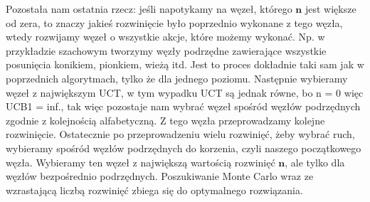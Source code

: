 Pozostała nam ostatnia rzecz: jeśli napotykamy na węzeł, którego $\boldsymbol{n}$ jest większe od zera, to znaczy jakieś rozwinięcie było poprzednio wykonane z tego węzła, wtedy rozwijamy węzeł o wszystkie akcje, które możemy wykonać. Np. w przykładzie szachowym tworzymy węzły podrzędne zawierające wszystkie posunięcia konikiem, pionkiem, wieżą itd. Jest to proces dokładnie taki sam jak w poprzednich algorytmach, tylko że dla jednego poziomu. Następnie wybieramy węzeł z największym UCT, w tym wypadku UCT są jednak równe, bo n = 0 więc UCB1 = inf., tak więc pozostaje nam wybrać węzeł spośród węzłów podrzędnych zgodnie z kolejnością alfabetyczną. Z tego węzła przeprowadzamy kolejne rozwinięcie. Ostatecznie po przeprowadzeniu wielu rozwinięć, żeby wybrać ruch, wybieramy spośród węzłów podrzędnych do korzenia, czyli naszego początkowego węzła. Wybieramy ten węzeł z największą wartością rozwinięć $\boldsymbol{n}$, ale tylko dla węzłów bezpośrednio podrzędnych. Poszukiwanie Monte Carlo wraz ze wzrastającą liczbą rozwinięć zbiega się do optymalnego rozwiązania.


